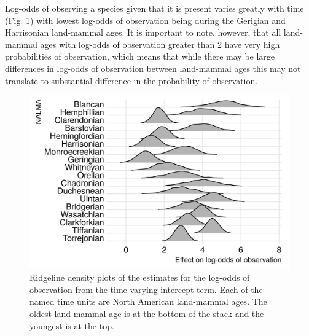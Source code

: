 \documentclass[12pt,letterpaper]{article}
\begin{document}
Log-odds of observing a species given that it is present varies greatly with time (Fig. \ref{fig:time_observe}) with lowest log-odds of observation being during the Gerigian and Harrisonian land-mammal ages. It is important to note, however, that all land-mammal ages with log-odds of observation greater than 2 have very high probabilities of observation, which means that while there may be large differences in log-odds of observation between land-mammal ages this may not translate to substantial difference in the probability of observation.
\begin{figure}[ht]
  \includegraphics[width=\textwidth,height=0.4\textheight,keepaspectratio=true]{figure/time_observation}
  \caption{Ridgeline density plots of the estimates for the log-odds of observation from the time-varying intercept term. Each of the named time units are North American land-mammal ages. The oldest land-mammal age is at the bottom of the stack and the youngest is at the top.}
  \label{fig:time_observe}
\end{figure}
\end{document}
